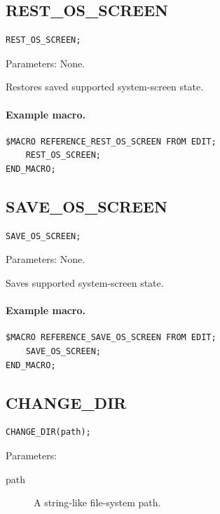 \documentclass[a4paper,10pt,twoside,openany]{book}
\begin{document}
\label{prim:procedure-rest-os-screen}
\subsection*{REST\_OS\_SCREEN}
\begin{verbatim}
REST_OS_SCREEN;
\end{verbatim}
Parameters: None.

Restores saved supported system-screen state.

\paragraph{Example macro.}
\begin{verbatim}
$MACRO REFERENCE_REST_OS_SCREEN FROM EDIT;
    REST_OS_SCREEN;
END_MACRO;
\end{verbatim}

\label{prim:procedure-save-os-screen}
\subsection*{SAVE\_OS\_SCREEN}
\begin{verbatim}
SAVE_OS_SCREEN;
\end{verbatim}
Parameters: None.

Saves supported system-screen state.

\paragraph{Example macro.}
\begin{verbatim}
$MACRO REFERENCE_SAVE_OS_SCREEN FROM EDIT;
    SAVE_OS_SCREEN;
END_MACRO;
\end{verbatim}

\label{prim:procedure-change-dir}
\subsection*{CHANGE\_DIR}
\begin{verbatim}
CHANGE_DIR(path);
\end{verbatim}
Parameters:
\begin{description}
\item[path] A string-like file-system path.
\end{description}
\end{document}
